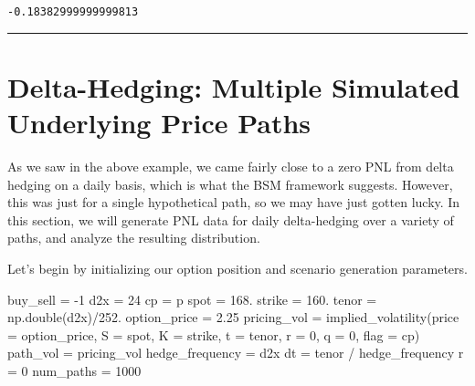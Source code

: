\documentclass[
  letterpaper,
  DIV=11,
  numbers=noendperiod]{scrreprt}
\newenvironment{Shaded}{\begin{snugshade}}{\end{snugshade}}
\newcommand{\DecValTok}[1]{\textcolor[rgb]{0.68,0.00,0.00}{#1}}
\newcommand{\FloatTok}[1]{\textcolor[rgb]{0.68,0.00,0.00}{#1}}
\newcommand{\NormalTok}[1]{\textcolor[rgb]{0.00,0.23,0.31}{#1}}
\newcommand{\OperatorTok}[1]{\textcolor[rgb]{0.37,0.37,0.37}{#1}}
\newcommand{\StringTok}[1]{\textcolor[rgb]{0.13,0.47,0.30}{#1}}
\begin{document}
\begin{verbatim}
-0.18382999999999813
\end{verbatim}

\begin{center}\rule{0.5\linewidth}{0.5pt}\end{center}

\hypertarget{delta-hedging-multiple-simulated-underlying-price-paths}{%
\section{Delta-Hedging: Multiple Simulated Underlying Price
Paths}\label{delta-hedging-multiple-simulated-underlying-price-paths}}

As we saw in the above example, we came fairly close to a zero PNL from
delta hedging on a daily basis, which is what the BSM framework
suggests. However, this was just for a single hypothetical path, so we
may have just gotten lucky. In this section, we will generate PNL data
for daily delta-hedging over a variety of paths, and analyze the
resulting distribution.

Let's begin by initializing our option position and scenario generation
parameters.

\begin{Shaded}
\begin{Highlighting}[]
\NormalTok{buy\_sell }\OperatorTok{=} \OperatorTok{{-}}\DecValTok{1}
\NormalTok{d2x }\OperatorTok{=} \DecValTok{24}
\NormalTok{cp }\OperatorTok{=} \StringTok{\textquotesingle{}p\textquotesingle{}}
\NormalTok{spot }\OperatorTok{=} \FloatTok{168.}
\NormalTok{strike }\OperatorTok{=} \FloatTok{160.}
\NormalTok{tenor }\OperatorTok{=}\NormalTok{ np.double(d2x)}\OperatorTok{/}\FloatTok{252.}
\NormalTok{option\_price }\OperatorTok{=} \FloatTok{2.25}
\NormalTok{pricing\_vol }\OperatorTok{=}\NormalTok{ implied\_volatility(price }\OperatorTok{=}\NormalTok{ option\_price, S }\OperatorTok{=}\NormalTok{ spot, K }\OperatorTok{=}\NormalTok{ strike, t }\OperatorTok{=}\NormalTok{ tenor, r }\OperatorTok{=} \DecValTok{0}\NormalTok{, q }\OperatorTok{=} \DecValTok{0}\NormalTok{, flag }\OperatorTok{=}\NormalTok{ cp)}
\NormalTok{path\_vol }\OperatorTok{=}\NormalTok{ pricing\_vol}
\NormalTok{hedge\_frequency }\OperatorTok{=}\NormalTok{ d2x}
\NormalTok{dt }\OperatorTok{=}\NormalTok{ tenor }\OperatorTok{/}\NormalTok{ hedge\_frequency}
\NormalTok{r }\OperatorTok{=} \DecValTok{0}
\NormalTok{num\_paths }\OperatorTok{=} \DecValTok{1000}
\end{Highlighting}
\end{Shaded}
\end{document}

